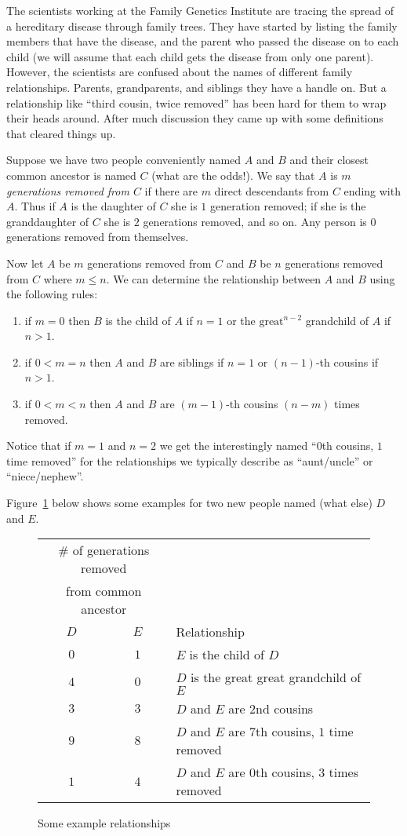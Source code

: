 \documentclass[UTF8]{ctexart}
\begin{document}
    
The scientists working at the Family Genetics Institute are tracing the spread of a hereditary disease through family trees.  They have started by listing the family members that have the disease, and the parent who passed the disease on to each child (we will assume that each child gets the disease from only one parent).  However, the scientists are confused about the names of different family relationships.  Parents, grandparents, and siblings they have a handle on.  But a relationship like ``third cousin, twice removed'' has been hard for them to wrap their heads around.   After much discussion they came up with some definitions that cleared things up.

Suppose we have two people conveniently named $A$ and $B$ and their closest common ancestor is named $C$ (what are the odds!).  We say that $A$ is {\em $m$ generations removed from $C$\/} if there are $m$ direct descendants from $C$ ending with $A$.  Thus if $A$ is the daughter of $C$ she is $1$ generation removed; if she is the granddaughter of $C$ she is $2$ generations removed, and so on.  Any person is $0$ generations removed from themselves.

Now let $A$ be $m$ generations removed from $C$ and $B$ be $n$ generations removed from $C$ where $m \leq n$.  We can determine the relationship between $A$ and $B$ using the following rules:
\begin{enumerate}
\item if $m = 0$ then $B$ is the child of $A$ if $n=1$ or the $\mbox{great}^{n-2}$ grandchild of $A$ if $n > 1$.
\item if $0 < m = n$ then $A$ and $B$ are siblings if $n=1$ or $(n-1)$-th cousins if $n > 1$.
\item if $0 < m < n$ then $A$ and $B$ are $(m-1)$-th cousins $(n-m)$ times removed.
\end{enumerate}
Notice that if $m = 1$ and $n = 2$ we get the interestingly named ``$0$th cousins, $1$ time removed'' for the relationships we typically describe as ``aunt/uncle'' or ``niece/nephew''.

Figure~\ref{fig:family1} below shows some examples for two new people named (what else) $D$ and $E$.
\begin{figure}[!ht]
\centering
\begin{tabular}{|c|c|l|} \hline
\multicolumn{2}{|c|}{\# of generations removed} & \\
\multicolumn{2}{|c|}{from common ancestor} & \\ \cline{1-2}
$D$ & $E$ & Relationship \\ \hline
$0$ & $1$ & $E$ is the child of $D$ \\ \hline
$4$ & $0$ & $D$ is the great great grandchild of $E$ \\ \hline
$3$ & $3$ & $D$ and $E$ are $2$nd cousins \\ \hline
$9$ & $8$ & $D$ and $E$ are $7$th cousins, $1$ time removed \\ \hline
$1$ & $4$ & $D$ and $E$ are $0$th cousins, $3$ times removed \\ \hline
\end{tabular}
\caption{Some example relationships}
\label{fig:family1}
\end{figure}
\end{document}
